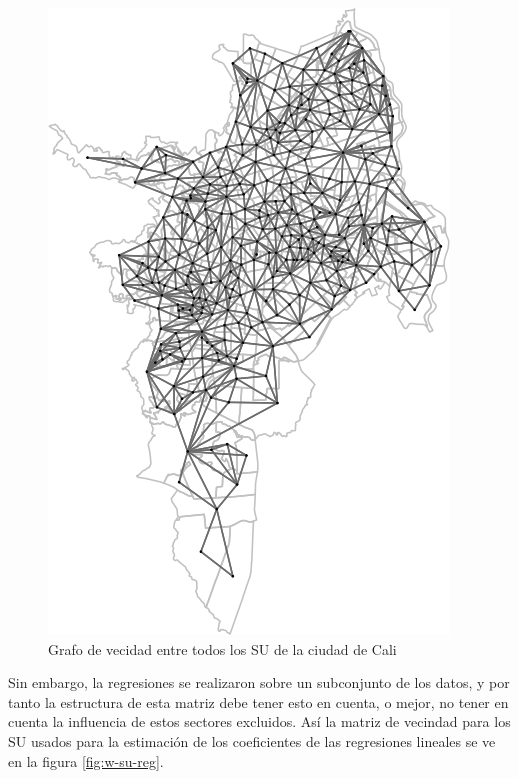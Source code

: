 \documentclass[12pt,]{book}
\begin{document}
\begin{figure}
\includegraphics[width=1\linewidth]{tesis-unigis_files/figure-latex/w-su-todos-1} \caption{Grafo de vecidad entre todos los SU de la ciudad de Cali}\label{fig:w-su-todos}
\end{figure}

Sin embargo, la regresiones se realizaron sobre un subconjunto de los
datos, y por tanto la estructura de esta matriz debe tener esto en
cuenta, o mejor, no tener en cuenta la influencia de estos sectores
excluidos. Así la matriz de vecindad para los SU usados para la
estimación de los coeficientes de las regresiones lineales se ve en la
figura \ref{fig:w-su-reg}.
\end{document}
